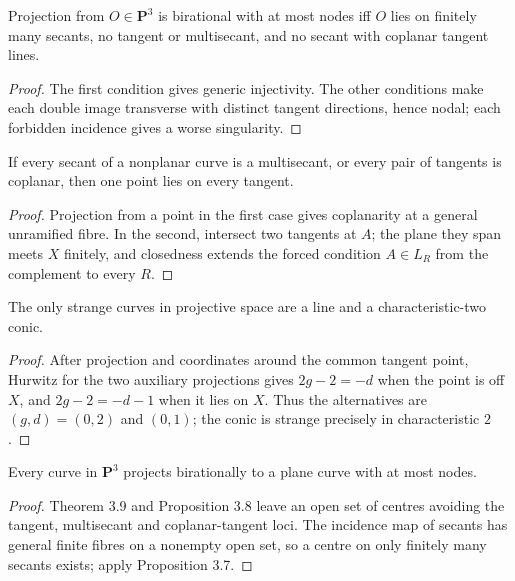 \begin{proposition}\label{ha-ch4-p37}
Projection from \(O\in\mathbf P^3\) is birational with at most nodes iff \(O\)
lies on finitely many secants, no tangent or multisecant, and no secant with
coplanar tangent lines.
\end{proposition}
\begin{proof}
The first condition gives generic injectivity.  The other conditions make
each double image transverse with distinct tangent directions, hence nodal;
each forbidden incidence gives a worse singularity.
\end{proof}

\begin{proposition}\label{ha-ch4-p38}
If every secant of a nonplanar curve is a multisecant, or every pair of
tangents is coplanar, then one point lies on every tangent.
\end{proposition}
\begin{proof}
Projection from a point in the first case gives coplanarity at a general
unramified fibre.  In the second, intersect two tangents at \(A\); the plane
they span meets \(X\) finitely, and closedness extends the forced condition
\(A\in L_R\) from the complement to every \(R\).
\end{proof}

\begin{theorem}[Samuel]\label{ha-ch4-t39}
The only strange curves in projective space are a line and a characteristic-two
conic.
\end{theorem}
\begin{proof}
After projection and coordinates around the common tangent point, Hurwitz for
the two auxiliary projections gives \(2g-2=-d\) when the point is off \(X\),
and \(2g-2=-d-1\) when it lies on \(X\).  Thus the alternatives are
\((g,d)=(0,2)\) and \((0,1)\); the conic is strange precisely in
characteristic \(2\).
\end{proof}

\begin{theorem}\label{ha-ch4-t310}
Every curve in \(\mathbf P^3\) projects birationally to a plane curve with at
most nodes.
\end{theorem}
\begin{proof}
Theorem 3.9 and Proposition 3.8 leave an open set of centres avoiding the
tangent, multisecant and coplanar-tangent loci.  The incidence map of secants
has general finite fibres on a nonempty open set, so a centre on only finitely
many secants exists; apply Proposition 3.7.
\end{proof}

